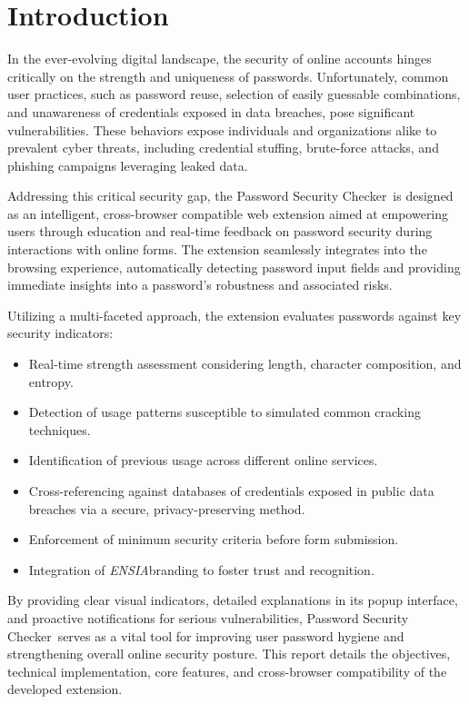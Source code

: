 \documentclass[11pt,oneside,a4paper]{book}
\newcommand{\extensionname}{Password Security Checker}
\newcommand{\esia}{\textit{ENSIA}}
\begin{document}
\mainmatter

\chapter{Introduction}
In the ever-evolving digital landscape, the security of online accounts hinges critically on the strength and uniqueness of passwords. Unfortunately, common user practices, such as password reuse, selection of easily guessable combinations, and unawareness of credentials exposed in data breaches, pose significant vulnerabilities. These behaviors expose individuals and organizations alike to prevalent cyber threats, including credential stuffing, brute-force attacks, and phishing campaigns leveraging leaked data.

Addressing this critical security gap, the \extensionname\ is designed as an intelligent, cross-browser compatible web extension aimed at empowering users through education and real-time feedback on password security during interactions with online forms. The extension seamlessly integrates into the browsing experience, automatically detecting password input fields and providing immediate insights into a password's robustness and associated risks.

Utilizing a multi-faceted approach, the extension evaluates passwords against key security indicators:
\begin{itemize}
    \item Real-time strength assessment considering length, character composition, and entropy.
    \item Detection of usage patterns susceptible to simulated common cracking techniques.
    \item Identification of previous usage across different online services.
    \item Cross-referencing against databases of credentials exposed in public data breaches via a secure, privacy-preserving method.
    \item Enforcement of minimum security criteria before form submission.
    \item Integration of \esia branding to foster trust and recognition.
\end{itemize}
By providing clear visual indicators, detailed explanations in its popup interface, and proactive notifications for serious vulnerabilities, \extensionname\ serves as a vital tool for improving user password hygiene and strengthening overall online security posture. This report details the objectives, technical implementation, core features, and cross-browser compatibility of the developed extension.
\end{document}
